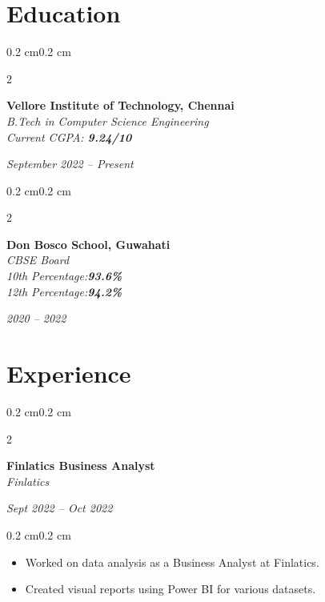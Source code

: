 \documentclass[10pt, letterpaper]{article}
\newenvironment{highlights}{
    \begin{itemize}[
        topsep=0.10 cm,
        parsep=0.10 cm,
        partopsep=0pt,
        itemsep=0pt,
        leftmargin=0.4 cm + 10pt
    ]
}{
    \end{itemize}
}
\newenvironment{onecolentry}{
    \begin{adjustwidth}{0.2 cm}{0.2 cm}
}{
    \end{adjustwidth}
}
\newenvironment{twocolentry}[2][]{
    \onecolentry
    \def\secondColumn{#2}
    \setcolumnwidth{\fill, 4.5 cm}
    \begin{paracol}{2}
}{
    \switchcolumn \raggedleft \secondColumn
    \end{paracol}
    \endonecolentry
}
\begin{document}
\section{Education}

\begin{twocolentry}{\textit{September 2022 – Present}}
    \textbf{Vellore Institute of Technology, Chennai}\\[0.07cm]
    \textit{B.Tech in Computer Science Engineering}\\
    \textit{Current CGPA: \textbf{9.24/10}}
\end{twocolentry}

\vspace{0.2 cm}

\begin{twocolentry}{\textit{2020 – 2022}}
    \textbf{Don Bosco School, Guwahati}\\[0.1cm]
    \textit{CBSE Board}\\
    \textit{10th Percentage:\quad \textbf{93.6\%}}\\
    \textit{12th Percentage:\quad \textbf{94.2\%}}
\end{twocolentry}

\section{Experience}

\begin{twocolentry}{
    \textit{Sept 2022 – Oct 2022}
}
    \textbf{Finlatics Business Analyst}\\
    \textit{Finlatics}
\end{twocolentry}

\vspace{0.10 cm}
\begin{onecolentry}
    \begin{highlights}
        \item Worked on data analysis as a Business Analyst at Finlatics.
        \item Created visual reports using Power BI for various datasets.
    \end{highlights}
\end{onecolentry}

\end{document}
